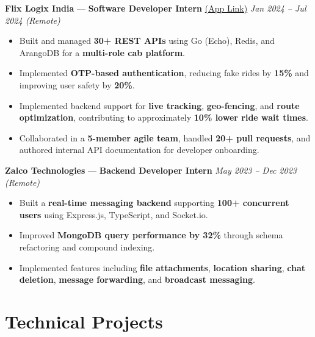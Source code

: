 \documentclass[10pt,a4paper]{article}
\begin{document}
\textbf{Flix Logix India} — \textbf{Software Developer Intern} 
\href{https://play.google.com/store/apps/details?id=com.triply.app&pcampaignid=web_share}{(App Link)}
\hfill \textit{Jan 2024 -- Jul 2024 (Remote)}
\begin{itemize}[leftmargin=1.2em]

\item Built and managed \textbf{30+ REST APIs} using Go (Echo), Redis, and ArangoDB for a \textbf{multi-role cab platform}.

\item Implemented \textbf{OTP-based authentication}, reducing fake rides by \textbf{15\%} and improving user safety by \textbf{20\%}.

\item Implemented backend support for \textbf{live tracking}, \textbf{geo-fencing}, and \textbf{route optimization}, contributing to approximately \textbf{10\% lower ride wait times}.

\item Collaborated in a \textbf{5-member agile team}, handled \textbf{20+ pull requests}, and authored internal API documentation for developer onboarding.

\end{itemize}
\vspace{0.4em}

\textbf{Zalco Technologies} — \textbf{Backend Developer Intern}
\hfill \textit{May 2023 -- Dec 2023 (Remote)}
\begin{itemize}[leftmargin=1.2em]

\item Built a \textbf{real-time messaging backend} supporting \textbf{100+ concurrent users} using Express.js, TypeScript, and Socket.io.

\item Improved \textbf{MongoDB query performance by 32\%} through schema refactoring and compound indexing.

\item Implemented features including \textbf{file attachments}, \textbf{location sharing}, \textbf{chat deletion}, \textbf{message forwarding}, and \textbf{broadcast messaging}.

\end{itemize}

\section*{Technical Projects}
\end{document}
